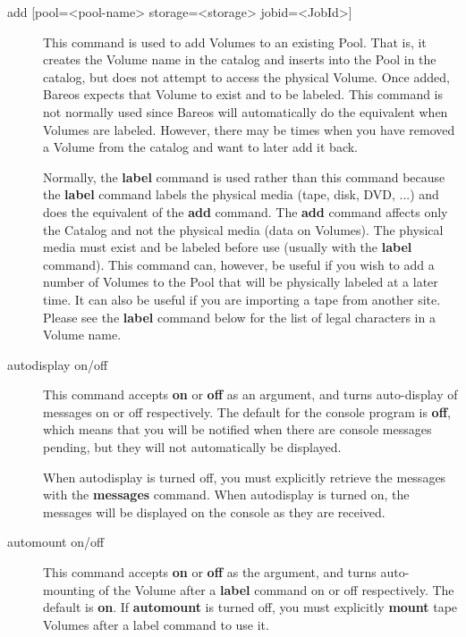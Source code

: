 \begin{description}
\item [{add [pool={\textless}pool-name{\textgreater} storage={\textless}storage{\textgreater}
   jobid={\textless}JobId{\textgreater}]} ]
   This command is used to add Volumes to an existing Pool.  That is,
   it creates the Volume name in the catalog and inserts into the Pool
   in the catalog, but does not attempt to access the physical Volume.
   Once
   added, Bareos expects that Volume to exist and to be labeled.
   This command is not normally used since Bareos will
   automatically do the equivalent when Volumes are labeled. However,
   there may be times when you have removed a Volume from the catalog
   and want to later add it back.

   Normally, the {\bf label} command is used rather than this command
   because the {\bf label} command labels the physical media (tape, disk,
   DVD, ...) and does the equivalent of the {\bf add} command.  The {\bf
   add} command affects only the Catalog and not the physical media (data
   on Volumes).  The physical media must exist and be labeled before use
   (usually with the {\bf label} command).  This command can, however, be
   useful if you wish to add a number of Volumes to the Pool that will be
   physically labeled at a later time.  It can also be useful if you are
   importing a tape from another site.  Please see the {\bf label} command
   below for the list of legal characters in a Volume name.

\item [autodisplay on/off]
   This command accepts {\bf on} or {\bf off} as an argument, and turns
   auto-display of messages on or off respectively.  The default for the
   console program is {\bf off}, which means that you will be notified when
   there are console messages pending, but they will not automatically be
   displayed.

   When autodisplay is turned off, you must explicitly retrieve the
   messages with the {\bf messages} command.  When autodisplay is turned
   on, the messages will be displayed on the console as they are received.

\item [automount on/off]
   This command accepts {\bf on} or {\bf off} as the argument, and turns
   auto-mounting of the Volume after a {\bf label} command on or off
   respectively.  The default is {\bf on}.  If {\bf automount} is turned
   off, you must explicitly {\bf mount} tape Volumes after a label command to
   use it.


\end{description}
